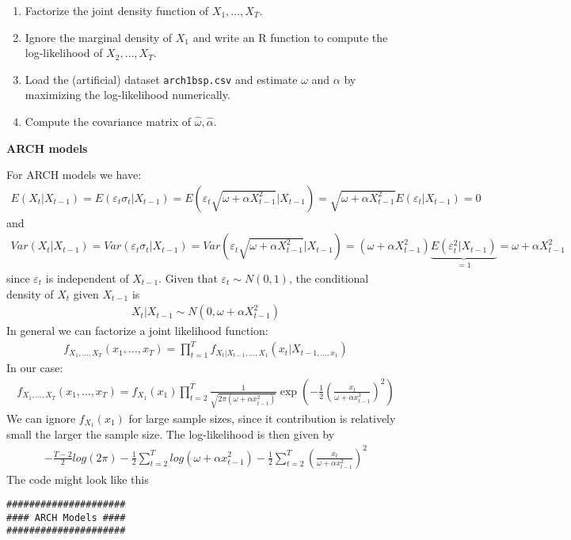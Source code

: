 \documentclass{article}
\begin{document}
\begin{enumerate}
\item Factorize the joint density function of $X_{1},\ldots ,X_{T}$.

\item Ignore the marginal density of $X_{1}$ and write an R function to
compute the log-likelihood of $X_{2},\ldots ,X_{T}$.

\item Load the (artificial) dataset \texttt{arch1bsp.csv} and estimate $%
\omega $ and $\alpha $ by maximizing the log-likelihood numerically.

\item Compute the covariance matrix of $\hat{\omega},\hat{\alpha}$.
\end{enumerate}

\begin{solution}
\textbf{ARCH models}

For ARCH models we have:
\begin{align*}
E(X_t|X_{t-1}) = E(\varepsilon_t \sigma_t|X_{t-1}) = E(\varepsilon_t\sqrt{\omega+\alpha X_{t-1}^2}|X_{t-1}) =\sqrt{\omega+\alpha X_{t-1}^2} E(\varepsilon_t|X_{t-1}) = 0
\end{align*}
and
\begin{align*}
Var(X_t|X_{t-1}) = Var(\varepsilon_t \sigma_t|X_{t-1}) = Var(\varepsilon_t\sqrt{\omega+\alpha X_{t-1}^2}|X_{t-1}) = (\omega+\alpha X_{t-1}^2)\underbrace{E(\varepsilon_t^2|X_{t-1})}_{=1} = \omega+\alpha X_{t-1}^2
\end{align*}
since $\varepsilon_t$ is independent of $X_{t-1}$. Given that $\varepsilon_t \sim N(0,1)$, the conditional density of $X_t$ given $X_{t-1}$ is
\begin{align*}
X_t|X_{t-1} \sim N(0,\omega+\alpha X_{t-1}^2)
\end{align*}
In general we can factorize a joint likelihood function:
\begin{align*}
  f_{X_1,\dots,X_T}(x_1,\dots,x_T) = \prod_{t=1}^{T}f_{X_t|X_{t-1},\dots,X_1}(x_t|X_{t-1,\dots,x_1})
\end{align*}
In our case:
\begin{align*}
  f_{X_1,\dots,X_T}(x_1,\dots,x_T) = f_{X_1}(x_1)\prod_{t=2}^{T}\frac{1}{\sqrt{2\pi(\omega+\alpha x_{t-1}^2)}}\exp\left(-\frac{1}{2}\left(\frac{x_t}{\omega+\alpha x_{t-1}^2}\right)^2\right)
\end{align*}
We can ignore $f_{X_1}(x_1)$ for large sample sizes, since it contribution is relatively small the larger the sample size. The log-likelihood is then given by
\begin{align*}
  -\frac{T-2}{2}log(2\pi)-\frac{1}{2}\sum_{t=2}^{T}log(\omega+\alpha x_{t-1}^2) - \frac{1}{2} \sum_{t=2}^{T} \left(\frac{x_t}{\omega+\alpha x_{t-1}^2}\right)^2
\end{align*}
The code might look like this
\begin{verbatim}
#####################
#### ARCH Models ####
#####################


\end{verbatim}
\end{solution}
\end{document}
